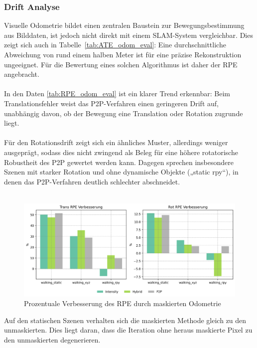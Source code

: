 \documentclass[12pt,DIV=15,BCOR=15mm,twoside,headsepline,abstract=true,listof=totoc,bibliography=totoc]{scrreprt}
\theoremstyle{remark}    %
\begin{document}
    \subsubsection{Drift Analyse}
    Visuelle Odometrie bildet einen zentralen Baustein zur Bewegungsbestimmung aus Bilddaten, ist jedoch nicht direkt mit einem \ac{SLAM}-System vergleichbar. 
    Dies zeigt sich auch in Tabelle~\ref{tab:ATE_odom_eval}: Eine durchschnittliche Abweichung von rund einem halben Meter ist für eine präzise Rekonstruktion 
    ungeeignet. Für die Bewertung eines solchen Algorithmus ist daher der \ac{RPE} angebracht.\\\\
    In den Daten \ref{tab:RPE_odom_eval} ist ein klarer Trend erkennbar: Beim Translationsfehler weist das \ac{P2P}-Verfahren einen geringeren Drift auf, unabhängig davon, 
    ob der Bewegung eine Translation oder Rotation zugrunde liegt.\\\\
    Für den Rotationsdrift zeigt sich ein ähnliches Muster, allerdings weniger ausgeprägt, sodass dies nicht zwingend als Beleg für eine höhere rotatorische 
    Robustheit des \ac{P2P} gewertet werden kann.
    Dagegen sprechen insbesondere Szenen mit starker Rotation und ohne dynamische Objekte („static rpy“), in denen das \ac{P2P}-Verfahren deutlich schlechter 
    abschneidet.\\\\
    \begin{figure}[ht]
        \centering
        \includegraphics[width=\textwidth]{pics/rel_imp_walking_rpy.png}
        \caption{Prozentuale Verbesserung des RPE durch maskierten Odometrie}
        \label{fig:rel_imp_odom_RPE}
    \end{figure}   
    Auf den statischen Szenen verhalten sich die maskierten Methode gleich zu den unmaskierten. Dies liegt daran, dass die Iteration ohne 
    heraus maskierte Pixel zu den unmaskierten degenerieren.\\\\
\end{document}
